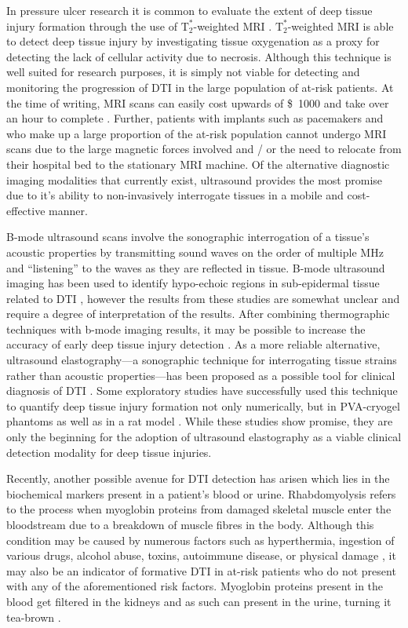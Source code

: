 			In pressure ulcer research it is common to evaluate the extent of deep tissue injury formation through the use of $\mathrm{T}_2^*$-weighted MRI \cite{loerakker11,stekelenburg06,solis12-03}. $\mathrm{T}_2^*$-weighted MRI is able to detect deep tissue injury by investigating tissue oxygenation as a proxy for detecting the lack of cellular activity due to necrosis. Although this technique is well suited for research purposes, it is simply not viable for detecting and monitoring the progression of DTI in the large population of at-risk patients. At the time of writing, MRI scans can easily cost upwards of \SI{1000}[\$]{} and take over an hour to complete . Further, patients with implants such as pacemakers and who make up a large proportion of the at-risk population cannot undergo MRI scans due to the large magnetic forces involved and / or the need to relocate from their hospital bed to the stationary MRI machine. Of the alternative diagnostic imaging modalities that currently exist, ultrasound provides the most promise due to it's ability to non-invasively interrogate tissues in a mobile and cost-effective manner.

			B-mode ultrasound scans involve the sonographic interrogation of a tissue's acoustic properties by transmitting sound waves on the order of multiple \si{MHz} and ``listening'' to the waves as they are reflected in tissue. B-mode ultrasound imaging has been used to identify hypo-echoic regions in sub-epidermal tissue related to DTI \cite{andersen08,aoi08,kanno09}, however the results from these studies are somewhat unclear and require a degree of interpretation of the results. After combining thermographic techniques with b-mode imaging results, it may be possible to increase the accuracy of early deep tissue injury detection \cite{higashino12}. As a more reliable alternative, ultrasound elastography---a sonographic technique for interrogating tissue strains rather than acoustic properties---has been proposed as a possible tool for clinical diagnosis of DTI \cite{gehin06,gefen09,gefen13}. Some exploratory studies have successfully used this technique to quantify deep tissue injury formation not only numerically, but in {PVA}-cryogel phantoms as well as in a rat model \cite{deprez07,deprez11}. While these studies show promise, they are only the beginning for the adoption of ultrasound elastography as a viable clinical detection modality for deep tissue injuries.

			Recently, another possible avenue for DTI detection has arisen which lies in the biochemical markers present in a patient's blood or urine. Rhabdomyolysis refers to the process when myoglobin proteins from damaged skeletal muscle enter the bloodstream due to a breakdown of muscle fibres in the body. Although this condition may be caused by numerous factors such as hyperthermia, ingestion of various drugs, alcohol abuse, toxins, autoimmune disease, or physical damage \cite{beetham00,sauret02}, it may also be an indicator of formative DTI in at-risk patients who do not present with any of the aforementioned risk factors. Myoglobin proteins present in the blood get filtered in the kidneys and as such can present in the urine, turning it tea-brown \cite{bagley07}.

